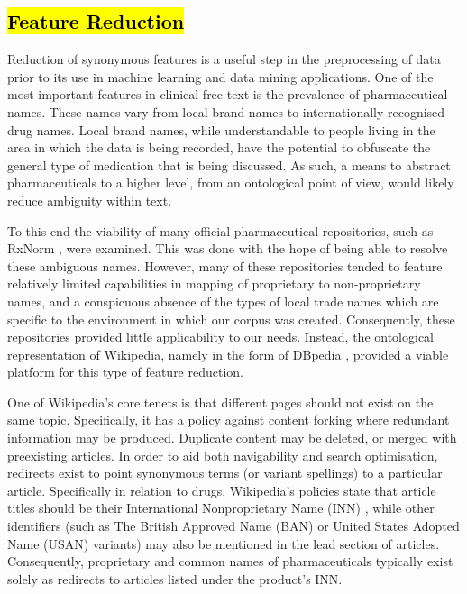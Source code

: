 \subsection{\hl{Feature Reduction}}
\label{section:dbpedia}


Reduction of synonymous features is a useful step in the preprocessing of data prior to its use in machine learning and data mining applications. One of the most important features in clinical free text is the prevalence of pharmaceutical names. These names vary from local brand names to internationally recognised drug names. Local brand names, while understandable to people living in the area in which the data is being recorded, have the potential to obfuscate the general type of medication that is being discussed. As such, a means to abstract pharmaceuticals to a higher level, from an ontological point of view, would likely reduce ambiguity within text.

To this end the viability of many official pharmaceutical repositories, such as RxNorm  \cite{nelson2011normalized}, were examined. This was done with the hope of being able to resolve these ambiguous names. However, many of these repositories tended to feature relatively limited capabilities in mapping of proprietary to non-proprietary names, and a conspicuous absence of the types of local trade names which are specific to the environment in which our corpus was created. Consequently, these repositories provided little applicability to our needs. Instead, the ontological representation of Wikipedia, namely in the form of DBpedia \cite{lehmann2015DBpedia}, provided a viable platform for this type of feature reduction.


One of Wikipedia's core tenets is that different pages should not exist on the same topic. Specifically, it has a policy against content forking where redundant information may be produced. Duplicate content may be deleted, or merged with preexisting articles. In order to aid both navigability and search optimisation, redirects exist to point synonymous terms (or variant spellings) to a particular article. Specifically in relation to drugs, Wikipedia's policies state that article titles should be their International Nonproprietary Name (INN) \cite{kopp1995international}, while other identifiers (such as The British Approved Name (BAN) \cite{british2002british} or United States Adopted Name (USAN)\cite{boring1997development} variants)  may also be mentioned in the lead section of articles. Consequently, proprietary and common names of pharmaceuticals typically exist solely as redirects to articles listed under the product's INN.

